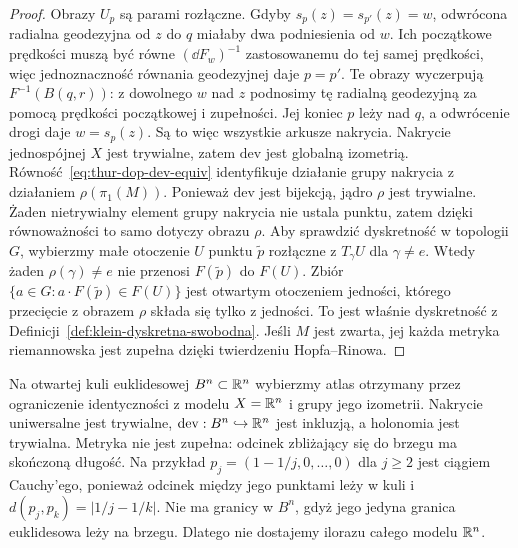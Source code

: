 \begin{proof}
Obrazy $U_p$ są parami rozłączne.
Gdyby $s_p(z)=s_{p'}(z)=w$, odwrócona radialna geodezyjna
od $z$ do $q$ miałaby dwa podniesienia od $w$.
Ich początkowe prędkości muszą być równe
$(\dd F_w)^{-1}$ zastosowanemu do tej samej prędkości,
więc jednoznaczność równania geodezyjnej daje $p=p'$.
Te obrazy wyczerpują $F^{-1}(B(q,r))$:
z dowolnego $w$ nad $z$ podnosimy tę radialną geodezyjną
za pomocą prędkości początkowej i zupełności.
Jej koniec $p$ leży nad $q$, a odwrócenie drogi daje $w=s_p(z)$.
Są to więc wszystkie arkusze nakrycia.
Nakrycie jednospójnej $X$ jest
trywialne, zatem $\mathrm{dev}$ jest globalną izometrią.
Równość~\eqref{eq:thur-dop-dev-equiv} identyfikuje
działanie grupy nakrycia z działaniem $\rho(\pi_1(M))$.
Ponieważ $\mathrm{dev}$ jest bijekcją, jądro $\rho$ jest
trywialne. Żaden nietrywialny element grupy nakrycia nie
ustala punktu, zatem dzięki równoważności to samo dotyczy
obrazu $\rho$.
Aby sprawdzić dyskretność w topologii $G$, wybierzmy małe
otoczenie $U$ punktu $\widetilde p$ rozłączne
z $T_\gamma U$ dla $\gamma\ne e$. Wtedy żaden
$\rho(\gamma)\ne e$ nie przenosi $F(\widetilde p)$ do
$F(U)$. Zbiór
$\{a\in G:a\cdot F(\widetilde p)\in F(U)\}$
jest otwartym otoczeniem jedności, którego przecięcie
z obrazem $\rho$ składa się tylko z jedności.
To jest właśnie dyskretność z
Definicji~\ref{def:klein-dyskretna-swobodna}.
Jeśli $M$ jest zwarta, jej każda metryka riemannowska
jest zupełna dzięki twierdzeniu Hopfa--Rinowa.
\end{proof}

\begin{przyklad}
\label{prz:thur-dop-struktura-niezupelna}
Na otwartej kuli euklidesowej $B^n\subset\mathbb{R}^n$ wybierzmy
atlas otrzymany przez ograniczenie identyczności
z modelu $X=\mathbb{R}^n$ i grupy jego izometrii. Nakrycie
uniwersalne jest trywialne, $\mathrm{dev}:B^n\hookrightarrow\mathbb{R}^n$
jest inkluzją, a holonomia jest trywialna.
Metryka nie jest zupełna: odcinek zbliżający się do brzegu
ma skończoną długość.
Na przykład $p_j=(1-1/j,0,\ldots,0)$ dla $j\geq2$
jest ciągiem Cauchy'ego, ponieważ odcinek między jego punktami
leży w kuli i $d(p_j,p_k)=|1/j-1/k|$.
Nie ma granicy w $B^n$, gdyż jego jedyna granica euklidesowa
leży na brzegu. Dlatego nie dostajemy
ilorazu całego modelu $\mathbb{R}^n$.
\end{przyklad}

